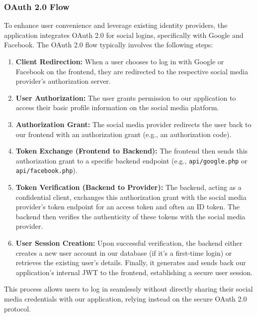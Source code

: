\documentclass{report}
\begin{document}
\subsubsection{OAuth 2.0 Flow}
\label{sec:oauth2_flow}
To enhance user convenience and leverage existing identity providers, the application integrates OAuth 2.0 for social logins, specifically with Google and Facebook. The OAuth 2.0 flow typically involves the following steps:
\begin{enumerate}
    \item \textbf{Client Redirection:} When a user chooses to log in with Google or Facebook on the frontend, they are redirected to the respective social media provider's authorization server.
    \item \textbf{User Authorization:} The user grants permission to our application to access their basic profile information on the social media platform.
    \item \textbf{Authorization Grant:} The social media provider redirects the user back to our frontend with an authorization grant (e.g., an authorization code).
    \item \textbf{Token Exchange (Frontend to Backend):} The frontend then sends this authorization grant to a specific backend endpoint (e.g., \texttt{api/google.php} or \texttt{api/facebook.php}).
    \item \textbf{Token Verification (Backend to Provider):} The backend, acting as a confidential client, exchanges this authorization grant with the social media provider's token endpoint for an access token and often an ID token. The backend then verifies the authenticity of these tokens with the social media provider.
    \item \textbf{User Session Creation:} Upon successful verification, the backend either creates a new user account in our database (if it's a first-time login) or retrieves the existing user's details. Finally, it generates and sends back our application's internal JWT to the frontend, establishing a secure user session.
\end{enumerate}
This process allows users to log in seamlessly without directly sharing their social media credentials with our application, relying instead on the secure OAuth 2.0 protocol.
\end{document}
